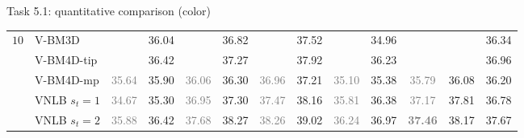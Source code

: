\documentclass[mathserif, 8pt]{beamer}
\newcommand{\best}[1]{#1}
\newcommand{\bsic}[1]{\textcolor{gray}{#1}}
\newcommand{\Bsic}[1]{\textcolor{gray}{\textbf{#1}}}
\newcommand{\Best}[1]{\textbf{\textcolor{MyOrangeBrighter}{#1}}}
\begin{document}
\begin{frame}{Task 5.1: quantitative comparison (color)}
\begin{center}
{\begin{tabular}{ c | l |c c | c c | c c | c c | c c | c}
%                                                                                                                                                                                                                          
			\multirow{1}{*}{$10$}
			                      & V-BM3D               & \bsic{     } &       36.04  & \bsic{     } &       36.82  & \bsic{     } &       37.52  & \bsic{     } &       34.96  & \bsic{     } &              &       36.34  \\
			                      & V-BM4D-tip           & \bsic{     } & \best{36.42} & \bsic{     } & \best{37.27} & \bsic{     } &       37.92  & \bsic{     } &       36.23  & \bsic{     } &              &       36.96  \\
			                      & V-BM4D-mp            & \bsic{35.64} &       35.90  & \bsic{36.06} &       36.30  & \bsic{36.96} &       37.21  & \bsic{35.10} &       35.38  & \bsic{35.79} &       36.08  &       36.20  \\
			                      & VNLB   $s_t = 1$     & \bsic{34.67} &       35.30  & \bsic{36.95} &       37.30  & \bsic{37.47} &       38.16  & \bsic{35.81} &       36.38  & \bsic{37.17} &       37.81  &       36.78  \\
			                      & VNLB   $s_t = 2$     & \bsic{35.88} &       36.42  & \bsic{37.68} &       38.27  & \bsic{38.26} &       39.02  & \bsic{36.24} &       36.97  & \Bsic{37.46} & \best{38.17} &       37.67  \\

\end{tabular}}
\end{center}
\end{frame}
\end{document}

